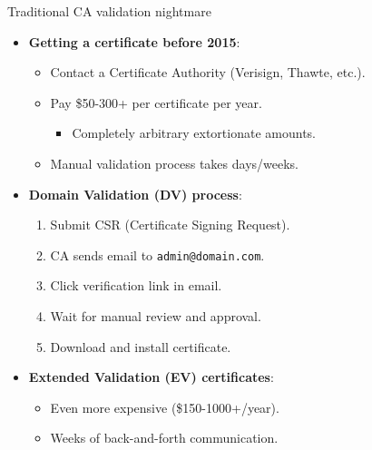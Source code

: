 \documentclass[aspectratio=169, lualatex, handout]{beamer}
\begin{document}
\begin{frame}{Traditional CA validation nightmare}
	\begin{itemize}[<+->]
		\item \textbf{Getting a certificate before 2015}:
		      \begin{itemize}
			      \item Contact a Certificate Authority (Verisign, Thawte, etc.).
			      \item Pay \$50-300+ per certificate per year.
			            \begin{itemize}
				            \item Completely arbitrary extortionate amounts.
			            \end{itemize}
			      \item Manual validation process takes days/weeks.
		      \end{itemize}
		\item \textbf{Domain Validation (DV) process}:
		      \begin{enumerate}
			      \item Submit CSR (Certificate Signing Request).
			      \item CA sends email to \texttt{admin@domain.com}.
			      \item Click verification link in email.
			      \item Wait for manual review and approval.
			      \item Download and install certificate.
		      \end{enumerate}
		\item \textbf{Extended Validation (EV) certificates}:
		      \begin{itemize}
			      \item Even more expensive (\$150-1000+/year).
			      \item Weeks of back-and-forth communication.
		      \end{itemize}
	\end{itemize}
\end{frame}
\end{document}

